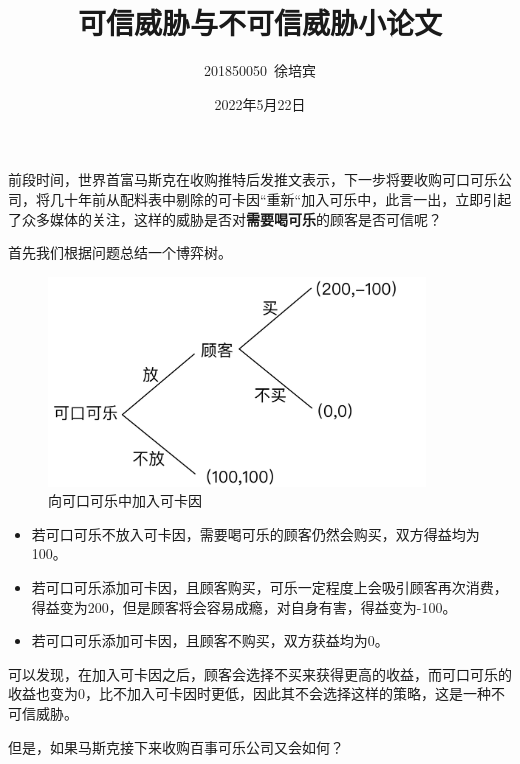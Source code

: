 \documentclass[UTF8]{article}
\title{可信威胁与不可信威胁小论文}
\author{201850050\ 徐培宾}
\date{2022年5月22日}
\begin{document}
    \maketitle
    前段时间，世界首富马斯克在收购推特后发推文表示，下一步将要收购可口可乐公司，将几十年前从配料表中剔除的可卡因“重新“加入可乐中，此言一出，立即引起了众多媒体的关注，这样的威胁是否对\textbf{需要喝可乐}的顾客是否可信呢？

    首先我们根据问题总结一个博弈树。
    \begin{figure}[H]
      \centering
      \includegraphics[width = 10cm]{cocacola.jpeg}
      \caption{向可口可乐中加入可卡因}
    \end{figure}
    \begin{itemize}
      \item 若可口可乐不放入可卡因，需要喝可乐的顾客仍然会购买，双方得益均为100。
      \item 若可口可乐添加可卡因，且顾客购买，可乐一定程度上会吸引顾客再次消费，得益变为200，但是顾客将会容易成瘾，对自身有害，得益变为-100。
      \item 若可口可乐添加可卡因，且顾客不购买，双方获益均为0。
    \end{itemize}
    
    可以发现，在加入可卡因之后，顾客会选择不买来获得更高的收益，而可口可乐的收益也变为0，比不加入可卡因时更低，因此其不会选择这样的策略，这是一种不可信威胁。

    但是，如果马斯克接下来收购百事可乐公司又会如何？
\end{document}
